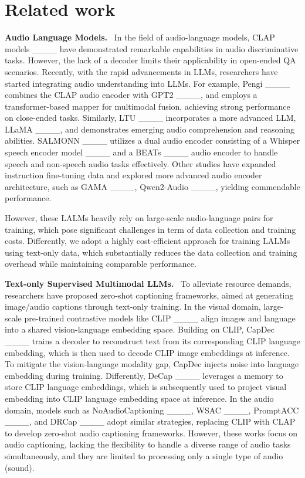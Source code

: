 \section{Related work}
\textbf{Audio Language Models.} \ 
In the field of audio-language models, CLAP models ____ have demonstrated  remarkable capabilities  in audio discriminative tasks. However, the lack of a decoder limits their applicability  in open-ended QA scenarios. Recently, with the rapid advancements in LLMs, researchers have started integrating audio understanding into LLMs. For example, Pengi   ____ combines the CLAP audio encoder with GPT2  ____, and employs a transformer-based mapper for multimodal fusion, achieving  strong performance on close-ended tasks. Similarly, LTU ____ incorporates a more advanced LLM, LLaMA ____, and demonstrates emerging audio comprehension and reasoning  abilities. SALMONN ____ utilizes a dual audio encoder consisting of a Whisper speech encoder model ____ and a BEATs ____ audio encoder to handle speech and non-speech audio tasks effectively. Other studies have expanded instruction fine-tuning data and explored more advanced audio encoder architecture, such as GAMA ____, Qwen2-Audio ____, yielding commendable performance. 

However, these LALMs heavily rely on large-scale audio-language pairs for training, which pose significant challenges in term of data collection and training costs. 
Differently, we adopt a highly cost-efficient approach for training LALMs using text-only data, which substantially reduces the data collection and training overhead while maintaining comparable performance.

\textbf{Text-only Supervised Multimodal LLMs.} \
To alleviate resource demands, researchers have proposed zero-shot captioning frameworks, aimed at generating image/audio captions through text-only training. In the visual domain, large-scale pre-trained contrastive models like CLIP ____ align images and language into a shared vision-language embedding space. Building on CLIP, 
CapDec ____ trains a decoder to reconstruct text from its corresponding CLIP language embedding,  which is then used to decode CLIP image embeddings at inference. To mitigate the vision-language modality gap, CapDec injects noise into language embedding during training.  Differently, DeCap ____ leverages a memory to store CLIP language embeddings, which is  subsequently used to project visual embedding into CLIP language embedding space at inference.  In the audio domain, models such as NoAudioCaptioning ____, WSAC ____, PromptACC ____, and DRCap ____ adopt similar strategies, replacing CLIP with CLAP to develop zero-shot audio captioning frameworks. %
However, these works focus on audio captioning, lacking the flexibility to handle a diverse range of audio tasks simultaneously, and they are limited to processing only a single type of audio (sound).